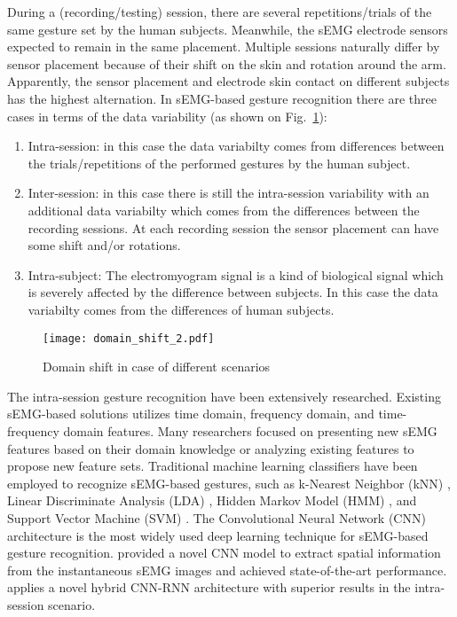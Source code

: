 \documentclass[conference]{IEEEtran}
\begin{document}
During a (recording/testing) session, there are several repetitions/trials of the same gesture set by the human subjects.
Meanwhile, the sEMG electrode sensors expected to remain in the same placement.
Multiple sessions naturally differ by sensor placement because of their shift on the skin and rotation around the arm.
Apparently, the sensor placement and electrode skin contact on different subjects has the highest alternation.
In sEMG-based gesture recognition there are three cases in terms of the data variability (as shown on Fig.~\ref{figure:domainShift}):
\begin{enumerate}
	\item Intra-session: in this case the data variabilty comes from differences between the trials/repetitions of the performed gestures by the human subject.
	\item Inter-session: in this case there is still the intra-session variability with an additional data variabilty which comes from the differences between the recording sessions.
	At each recording session the sensor placement can have some shift and/or rotations.
	\item Intra-subject: The electromyogram signal is a kind of biological signal which is severely affected by the
	difference between subjects. In this case the data variabilty comes from the differences of human subjects.
\end{enumerate}

\begin{figure}[tbp]
	\centerline{\texttt{[image: domain\_shift\_2.pdf]}}
	\caption{Domain shift in case of different scenarios}
	\label{figure:domainShift}
\end{figure}

The intra-session gesture recognition have been extensively researched.
Existing sEMG-based solutions utilizes time domain, frequency domain, and time-frequency domain features.
Many researchers focused on presenting new sEMG features based on their domain knowledge or analyzing existing features to propose new feature sets.
Traditional machine learning classifiers have been employed to recognize sEMG-based gestures, such as k-Nearest Neighbor (kNN) \cite{b20},
Linear Discriminate Analysis (LDA) \cite{b21}, Hidden Markov Model (HMM) \cite{b22}, and Support Vector Machine (SVM) \cite{b20}\cite{b23}.
The Convolutional Neural Network (CNN) architecture is the most widely used deep learning technique for sEMG-based gesture recognition.
\cite{b18} provided a novel CNN model to extract spatial information from the instantaneous sEMG images and achieved state-of-the-art performance.
\cite{b19} applies a novel hybrid CNN-RNN architecture with superior results in the intra-session scenario.
\end{document}
